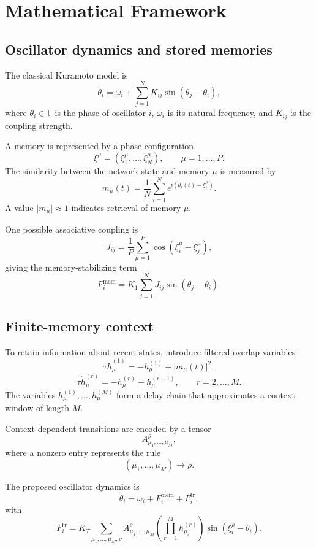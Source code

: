 \documentclass[11pt]{article}
\begin{document}
\section{Mathematical Framework}

\subsection*{Oscillator dynamics and stored memories}

The classical Kuramoto model is \cite{kuramoto}
\[
\dot{\theta}_i
=
\omega_i
+
\sum_{j=1}^{N}K_{ij}\sin(\theta_j-\theta_i),
\]
where \(\theta_i\in\mathbb{T}\) is the phase of oscillator \(i\), \(\omega_i\) is its natural frequency, and \(K_{ij}\) is the coupling strength.

A memory is represented by a phase configuration
\[
\xi^\mu=(\xi_1^\mu,\ldots,\xi_N^\mu),
\qquad
\mu=1,\ldots,P.
\]
The similarity between the network state and memory \(\mu\) is measured by
\[
m_\mu(t)
=
\frac{1}{N}\sum_{i=1}^{N}
e^{\mathrm{i}(\theta_i(t)-\xi_i^\mu)}.
\]
A value \(\lvert m_\mu\rvert\approx 1\) indicates retrieval of memory \(\mu\).

One possible associative coupling is
\[
J_{ij}
=
\frac{1}{P}
\sum_{\mu=1}^{P}
\cos(\xi_i^\mu-\xi_j^\mu),
\]
giving the memory-stabilizing term
\[
F_i^{\mathrm{mem}}
=
K_1\sum_{j=1}^{N}
J_{ij}\sin(\theta_j-\theta_i).
\]

\subsection*{Finite-memory context}

To retain information about recent states, introduce filtered overlap variables
\[
\tau\dot{h}^{(1)}_\mu
=
-h^{(1)}_\mu+\lvert m_\mu(t)\rvert^2,
\]
\[
\tau\dot{h}^{(r)}_\mu
=
-h^{(r)}_\mu+h^{(r-1)}_\mu,
\qquad r=2,\ldots,M.
\]
The variables \(h_\mu^{(1)},\ldots,h_\mu^{(M)}\) form a delay chain that approximates a context window of length \(M\).

Context-dependent transitions are encoded by a tensor
\[
A_{\mu_1,\ldots,\mu_M}^{\rho},
\]
where a nonzero entry represents the rule
\[
(\mu_1,\ldots,\mu_M)\to\rho.
\]


The proposed oscillator dynamics is
\[
\dot{\theta}_i
=
\omega_i
+
F_i^{\mathrm{mem}}
+
F_i^{\mathrm{tr}},
\]
with
\[
F_i^{\mathrm{tr}}
=
K_T
\sum_{\mu_1,\ldots,\mu_M,\rho}
A_{\mu_1,\ldots,\mu_M}^{\rho}
\left(
\prod_{r=1}^{M}h_{\mu_r}^{(r)}
\right)
\sin(\xi_i^\rho-\theta_i).
\]
\end{document}

